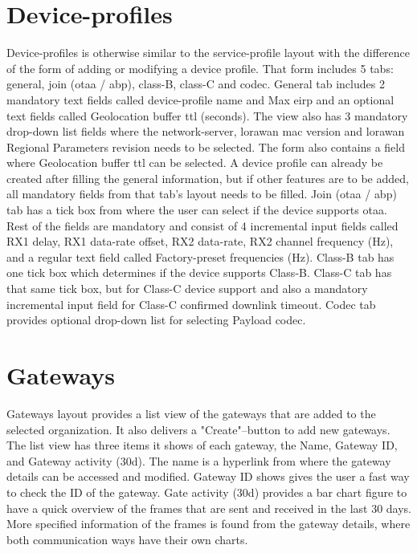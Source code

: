 \section{Device-profiles}
Device-profiles is otherwise similar to the service-profile layout with the difference of the form of adding or modifying a device profile.
That form includes 5 tabs: general, join (\gls{otaa} / \gls{abp}), class-B, class-C and codec.
General tab includes 2 mandatory text fields called device-profile name and Max \gls{eirp} and an optional text fields called Geolocation buffer \gls{ttl} (seconds). The view also has 3 mandatory drop-down list fields where the network-server, \gls{lorawan} \gls{mac} version and \gls{lorawan} Regional Parameters revision needs to be selected.
The form also contains a field where Geolocation buffer \gls{ttl} can be selected.
A device profile can already be created after filling the general information, but if other features are to be added, all mandatory fields from that tab's layout needs to be filled.
Join (\gls{otaa} / \gls{abp}) tab has a tick box from where the user can select if the device supports \gls{otaa}.
Rest of the fields are mandatory and consist of 4 incremental input fields called RX1 delay, RX1 data-rate offset, RX2 data-rate, RX2 channel frequency (Hz), and a regular text field called Factory-preset frequencies (Hz).
Class-B tab has one tick box which determines if the device supports Class-B.
Class-C tab  has that same tick box, but for Class-C device support and also a mandatory incremental input field for Class-C confirmed downlink timeout.
Codec tab provides optional drop-down list for selecting Payload codec.

\section{Gateways}
Gateways layout provides a list view of the gateways that are added to the selected organization. 
It also delivers a "Create"--button to add new gateways.
The list view has three items it shows of each gateway, the Name, Gateway ID, and Gateway activity (30d).
The name is a hyperlink from where the gateway details can be accessed and modified.
Gateway ID shows gives the user a fast way to check the ID of the gateway. 
Gate activity (30d) provides a bar chart figure to have a quick overview of the frames that are sent and received in the last 30 days.
More specified information of the frames is found from the gateway details, where both communication ways have their own charts.

